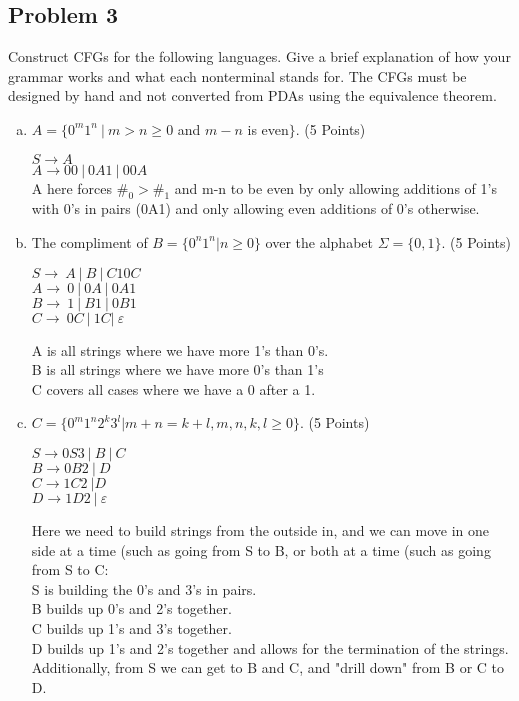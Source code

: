 \documentclass{article}
\begin{document}
\newpage


\subsection*{Problem 3}
Construct CFGs for the following languages. Give a brief explanation of how your
grammar works and what each nonterminal stands for. The CFGs must be designed
by hand and not converted from PDAs using the equivalence theorem.

\begin{enumerate}[(a)]
\item $A = \{0^m1^n\ |\ m > n \geq 0$ and $ m - n$ is even$\}$. (5 Points)

$S \rightarrow A$ \\
$A \rightarrow 00\ |\ 0A1\ |\ 00A $\\
A here forces $\#_0 > \#_1$ and m-n to be even by only allowing additions of 1's with 0's in
pairs (0A1) and only allowing even additions of 0's otherwise.


\item The compliment of $B = \{0^n1^n | n \geq 0\}$ over the alphabet $\Sigma = \{0,1\}$. (5 Points)

$S \rightarrow\ A\ |\ B\ |\ C10C $ \\
$A \rightarrow\ 0\ |\ 0A\ |\ 0A1 $ \\
$B \rightarrow\ 1\ |\ B1\ |\ 0B1 $ \\
$C \rightarrow\ 0C\ |\ 1C |\ \varepsilon $

A is all strings where we have more 1's than 0's. \\
B is all strings where we have more 0's than 1's \\
C covers all cases where we have a 0 after a 1.

\item $C = \{0^m1^n2^k3^l | m+n=k+l, m,n,k,l \geq 0\}$. (5 Points)

$S \rightarrow 0S3\ |\ B\ |\ C $ \\
$B \rightarrow 0B2\ |\ D $ \\
$C \rightarrow 1C2\ | D $ \\
$D \rightarrow 1D2\ |\ \varepsilon$

Here we need to build strings from the outside in, and we can move in one side at a time
(such as going from S to B, or both at a time (such as going from S to C: \\
S is building the 0's and 3's in pairs. \\
B builds up 0's and 2's together. \\
C builds up 1's and 3's together. \\
D builds up 1's and 2's together and allows for the termination of the strings. Additionally,
from S we can get to B and C, and "drill down" from B or C to D.

\end{enumerate}
\end{document}
